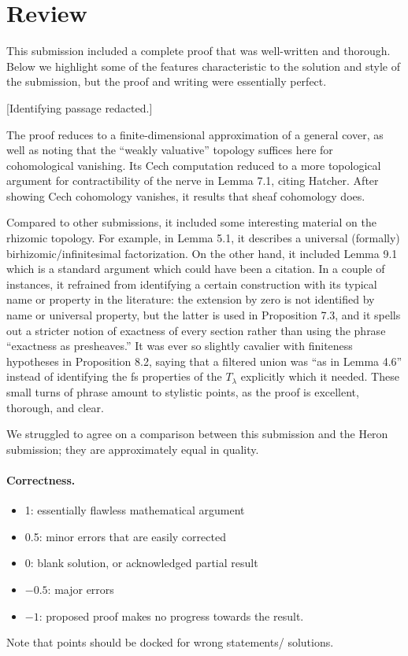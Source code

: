 \documentclass[11pt]{article}
\theoremstyle{definition}
\theoremstyle{remark}
\begin{document}
\maketitle

\section{Review}

This submission included a complete proof that was well-written and thorough. Below we highlight some of the features characteristic to the solution and style of the submission, but the proof and writing were essentially perfect. 

[Identifying passage redacted.]

The proof reduces to a finite-dimensional approximation of a general cover, as well as noting that the ``weakly valuative'' topology suffices here for cohomological vanishing. Its Cech computation reduced to a more topological argument for contractibility of the nerve in Lemma 7.1, citing Hatcher. After showing Cech cohomology vanishes, it results that sheaf cohomology does. 

Compared to other submissions, it included some interesting material on the rhizomic topology. For example, in Lemma 5.1, it describes a universal (formally) birhizomic/infinitesimal factorization. On the other hand, it included Lemma 9.1 which is a standard argument which could have been a citation. In a couple of instances, it refrained from identifying a certain construction with its typical name or property in the literature: the extension by zero is not identified by name or universal property, but the latter is used in Proposition 7.3, and it spells out a stricter notion of exactness of every section rather than using the phrase ``exactness as presheaves.'' It was ever so slightly cavalier with finiteness hypotheses in Proposition 8.2, saying that a filtered union was ``as in Lemma 4.6'' instead of identifying the fs properties of the $T_\lambda$ explicitly which it needed. These small turns of phrase amount to stylistic points, as the proof is excellent, thorough, and clear. 

We struggled to agree on a comparison between this submission and the Heron submission; they are approximately equal in quality. 


\paragraph{Correctness.}
\begin{itemize}
	\item  1: essentially flawless mathematical argument
	\item  0.5: minor errors that are easily corrected
	\item  0: blank solution, or acknowledged partial result
	\item  $-0.5$: major errors
	\item  $-1$: proposed proof makes no progress towards the result.
\end{itemize}
Note that points should be docked for wrong statements/ solutions.
\end{document}
